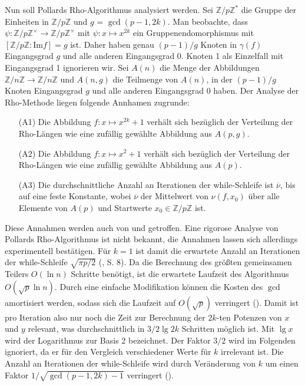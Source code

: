\documentclass[a4paper, 10pt, ngerman]{article}
\newcommand{\Z}{\mathbb{Z}}
\begin{document}
\noindent Nun soll Pollards Rho-Algorithmus analysiert werden. Sei $\Z/p\Z^*$ die Gruppe der Einheiten in $\Z/p\Z$ und $g$ = $\gcd(p - 1, 2k)$. Man beobachte, dass $\psi : \Z/p\Z^\times \to \Z/p\Z^\times$ mit $\psi : x \mapsto x^{2k}$ ein Gruppenendomorphismus mit $[\Z/p\Z : \text{Im} f] = g$ ist. Daher haben genau $(p - 1) / g$ Knoten in $\gamma(f)$ Eingangsgrad $g$ und alle anderen Eingangsgrad 0. Knoten 1 als Einzelfall mit Eingangsgrad 1 ignorieren wir. Sei $A(n)$ die Menge der Abbildungen $\Z/n\Z \to \Z/n\Z$ und $A(n, g)$ die Teilmenge von $A(n)$, in der $(p - 1) / g$ Knoten Eingangsgrad $g$ und alle anderen Eingangsgrad 0 haben. Der Analyse der Rho-Methode liegen folgende Annhamen zugrunde:
\begin{itemize}
    \item[(A1)] Die Abbildung $f : x \mapsto x^{2k} + 1$ verhält sich bezüglich der Verteilung der Rho-Längen wie eine zufällig gewählte Abbildung aus $A(p, g)$.
    \item[(A2)] Die Abbildung $f : x \mapsto x^{2} + 1$ verhält sich bezüglich der Verteilung der Rho-Längen wie eine zufällig gewählte Abbildung aus $A(p)$.
    \item[(A3)] Die durchschnittliche Anzahl an Iterationen der while-Schleife ist $\overline \nu$, bis auf eine feste Konstante, wobei $\overline \nu$ der Mittelwert von $\nu(f, x_0)$ über alle Elemente von $A(p)$ und Startwerte $x_0 \in \Z/p\Z$ ist.
\end{itemize}
Diese Annahmen werden auch von \cite{pol75} und \cite{bp81} getroffen. Eine rigorose Analyse von Pollards Rho-Algorithmus ist nicht bekannt, die Annahmen lassen sich allerdings experimentell bestätigen. Für $k = 1$ ist damit die erwartete Anzahl an Iterationen der while-Schleife $\sqrt{\pi p / 2}$ (\cite{knu98}, S. 8). Da die Berechnung des größten gemeinsamen Teilers $O(\ln n)$ Schritte benötigt, ist die erwartete Laufzeit des Algorithmus $O(\sqrt p \ln n)$. Durch eine einfache Modifikation können die Kosten des $\gcd$ amortisiert werden, sodass sich die Laufzeit auf $O(\sqrt p)$ verringert (\cite{bre80}). Damit ist pro Iteration also nur noch die Zeit zur Berechnung der $2k$-ten Potenzen von $x$ und $y$ relevant, was durchschnittlich in $3/2 \lg 2k$ Schritten möglich ist. Mit $\lg x$ wird der Logarithmus zur Basis 2 bezeichnet. Der Faktor $3/2$ wird im Folgenden ignoriert, da er für den Vergleich verschiedener Werte für $k$ irrelevant ist. Die Anzahl an Iterationen der while-Schleife wird durch Veränderung von $k$ um einen Faktor $1/\sqrt{\gcd(p - 1, 2k) - 1}$ verringert (\cite{bp81}).
\end{document}
